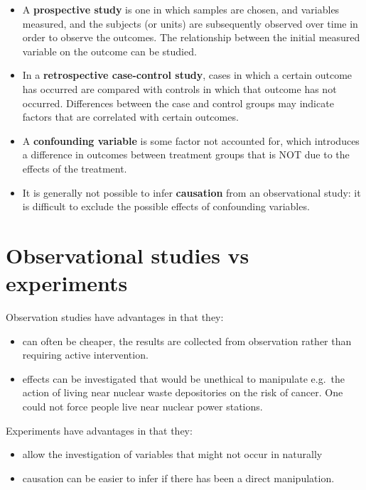 \documentclass[
  oneside]{krantz}
\providecommand{\tightlist}{%
  \setlength{\itemsep}{0pt}\setlength{\parskip}{0pt}}
\begin{document}
\begin{itemize}
\item
  A \textbf{prospective study} is one in which samples are chosen, and variables measured, and the subjects (or units) are subsequently observed over time in order to observe the outcomes. The relationship between the initial measured variable on the outcome can be studied.
\item
  In a \textbf{retrospective case-control study}, cases in which a certain outcome has occurred are compared with controls in which that outcome has not occurred. Differences between the case and control groups may indicate factors that are correlated with certain outcomes.
\item
  A \textbf{confounding variable} is some factor not accounted for, which introduces a difference in outcomes between treatment groups that is NOT due to the effects of the treatment.
\item
  It is generally not possible to infer \textbf{causation} from an observational study: it is difficult to exclude the possible effects of confounding variables.
\end{itemize}

\hypertarget{observational-studies-vs-experiments}{%
\section{Observational studies vs experiments}\label{observational-studies-vs-experiments}}

Observation studies have advantages in that they:

\begin{itemize}
\tightlist
\item
  can often be cheaper, the results are collected from observation rather than requiring active intervention.
\item
  effects can be investigated that would be unethical to manipulate e.g.~the action of living near nuclear waste depositories on the risk of cancer. One could not force people live near nuclear power stations.
\end{itemize}

Experiments have advantages in that they:

\begin{itemize}
\tightlist
\item
  allow the investigation of variables that might not occur in naturally
\item
  causation can be easier to infer if there has been a direct manipulation.
\end{itemize}
\end{document}

